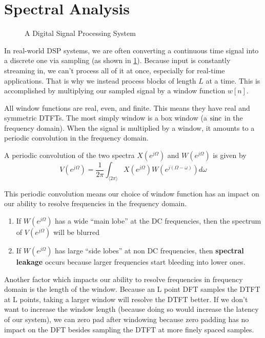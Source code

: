 \section{Spectral Analysis}
\begin{gitbook-image}
\begin{figure}[!h]
  \centering
  \caption{A Digital Signal Processing System}
  \label{fig:dsp}
\end{figure}
\end{gitbook-image}
In real-world DSP systems, we are often converting a continuous time signal into a discrete one via sampling (as shown in \cref{fig:dsp}).
Because input is constantly streaming in, we can't process all of it at once, especially for real-time applications.
That is why we instead process blocks of length $L$ at a time. This is accomplished by multiplying our sampled signal by a window function $w[n]$.

All window functions are real, even, and finite. This means they have real and symmetric DTFTs. 
The most simply window is a box window (a $\operatorname*{sinc}$ in the frequency domain).
When the signal is multiplied by a window, it amounts to a periodic convolution in the frequency domain.
\begin{definition}
  A periodic convolution of the two spectra $X(e^{j\Omega})$ and $W(e^{j\Omega})$ is given by
  \[
	V(e^{j\Omega})=\frac{1}{2\pi}\int_{\langle 2\pi \rangle}X(e^{j\Omega})W(e^{j(\Omega-\omega)})d\omega
  \]
  \label{defn:periodic-conv}
\end{definition}
This periodic convolution means our choice of window function has an impact on our ability to resolve frequencies in the frequency domain.
\begin{enumerate}
  \item If $W(e^{j\Omega})$ has a wide ``main lobe'' at the DC frequencies, then the spectrum of $V(e^{j\Omega})$ will be blurred
  \item If $W(e^{j\Omega})$ has large ``side lobes'' at non DC frequencies, then \textbf{spectral leakage} occurs because larger frequencies start bleeding into lower ones.
\end{enumerate}
Another factor which impacts our ability to resolve frequencies in frequency domain is the length of the window. Because an L point DFT samples the DTFT at L points, taking a larger window will resolve the DTFT better.
If we don't want to increase the window length (because doing so would increase the latency of our system), we can zero pad after windowing because zero padding has no impact on the DFT besides sampling the DTFT at more finely spaced samples.
